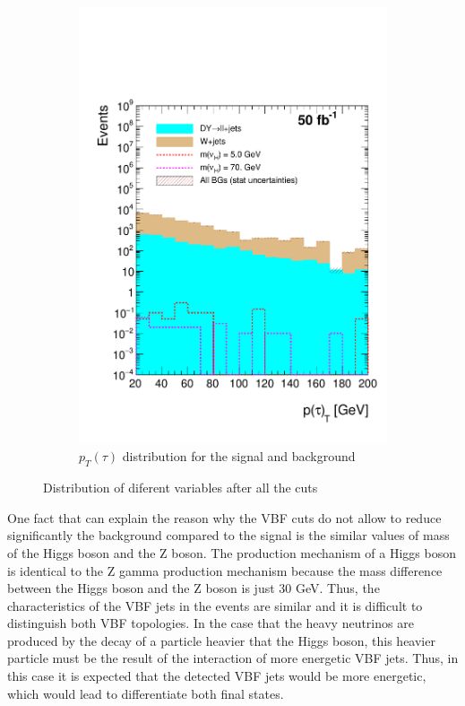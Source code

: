 \begin{figure}[h]
\begin{subfigure}{.5\textwidth}
  \includegraphics[width=1.1\linewidth]{./Capitulos/Analysis/AfterVBFCUTS/TauPt_MET20}
  \caption{$p_T(\tau)$ distribution for the signal and background}
  \label{taupt_VBF}
\end{subfigure}
\caption{Distribution of diferent variables after all the cuts}
\label{Variables_bjets}
\end{figure}
 
One fact that can explain the reason why the VBF cuts do not allow to reduce significantly the background compared to the signal is the similar values of mass of the Higgs boson and the Z boson.
The production mechanism of a Higgs boson is 
identical to the Z gamma production mechanism because the mass difference between the Higgs boson and the Z boson is just 30 GeV. Thus, the characteristics of the VBF jets in the events are similar
and it is difficult to distinguish both VBF topologies. In the case that the heavy neutrinos are produced by the decay of a particle heavier that the Higgs boson, this heavier particle must be the
result of the interaction of more energetic VBF jets. Thus, in this case it is expected that the detected VBF jets would be more energetic, which would lead to differentiate both final states.

